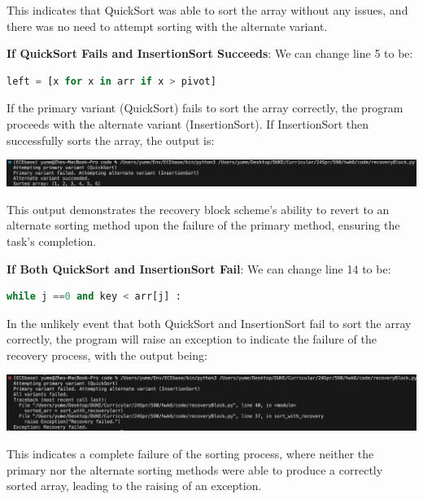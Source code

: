 \documentclass[12pt]{article}
\numberwithin{table}{section}
\begin{document}
This indicates that QuickSort was able to sort the array without any issues, and there was no need to attempt sorting with the alternate variant.

\textbf{If QuickSort Fails and InsertionSort Succeeds}: We can change line 5 to be: 

	\begin{lstlisting}[language=python]
left = [x for x in arr if x > pivot]\end{lstlisting} 

If the primary variant (QuickSort) fails to sort the array correctly, the program proceeds with the alternate variant (InsertionSort). If InsertionSort then successfully sorts the array, the output is:

\begin{center}
	\includegraphics[width=1\textwidth]{image/2.eps}
\end{center}

This output demonstrates the recovery block scheme's ability to revert to an alternate sorting method upon the failure of the primary method, ensuring the task's completion.

\textbf{If Both QuickSort and InsertionSort Fail}: We can change line 14 to be: 

	\begin{lstlisting}[language=python]
while j ==0 and key < arr[j] :\end{lstlisting} 

 In the unlikely event that both QuickSort and InsertionSort fail to sort the array correctly, the program will raise an exception to indicate the failure of the recovery process, with the output being:

\begin{center}
	\includegraphics[width=1\textwidth]{image/3.eps}
\end{center}

This indicates a complete failure of the sorting process, where neither the primary nor the alternate sorting methods were able to produce a correctly sorted array, leading to the raising of an exception.
\end{document}
